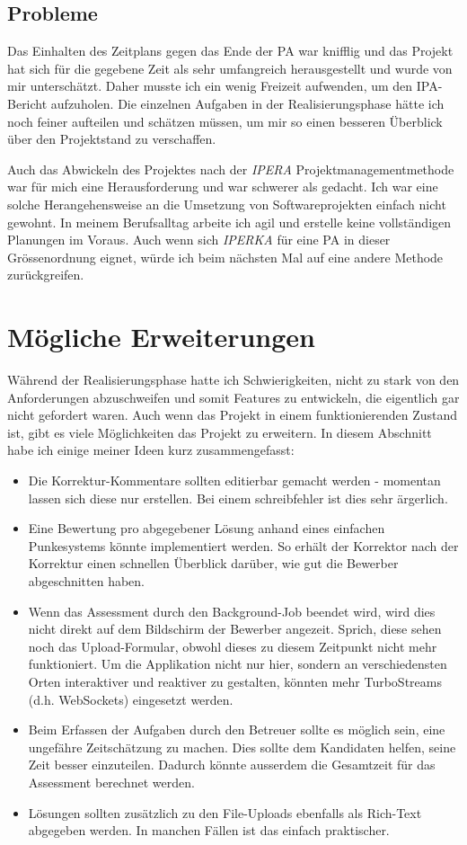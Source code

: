 \subsection{Probleme}
Das Einhalten des Zeitplans gegen das Ende der PA war knifflig und das Projekt hat sich für die gegebene
Zeit als sehr umfangreich herausgestellt und wurde von mir unterschätzt. Daher musste ich ein wenig Freizeit aufwenden,
um den IPA-Bericht aufzuholen. Die einzelnen Aufgaben in der Realisierungsphase hätte ich noch feiner aufteilen und schätzen müssen, um mir so einen
besseren Überblick über den Projektstand zu verschaffen.

Auch das Abwickeln des Projektes nach der \emph{IPERA} Projektmanagementmethode war für mich eine Herausforderung und war schwerer als gedacht. 
Ich war eine solche Herangehensweise an die Umsetzung von Softwareprojekten einfach nicht gewohnt. In meinem
Berufsalltag arbeite ich agil und erstelle keine vollständigen Planungen im Voraus. Auch wenn sich \emph{IPERKA} für eine PA in dieser Grössenordnung
eignet, würde ich beim nächsten Mal auf eine andere Methode zurückgreifen.

\section{Mögliche Erweiterungen}

Während der Realisierungsphase hatte ich Schwierigkeiten, nicht zu stark von den Anforderungen abzuschweifen und somit Features zu
entwickeln, die eigentlich gar nicht gefordert waren. Auch wenn das Projekt in einem funktionierenden Zustand ist, gibt es viele Möglichkeiten
das Projekt zu erweitern. In diesem Abschnitt habe ich einige meiner Ideen kurz zusammengefasst:

\begin{itemize}
  \item Die Korrektur-Kommentare sollten editierbar gemacht werden - momentan lassen sich diese nur erstellen. Bei einem schreibfehler ist dies sehr ärgerlich.
  \item Eine Bewertung pro abgegebener Lösung anhand eines einfachen Punkesystems könnte implementiert werden. So erhält der Korrektor nach der Korrektur einen schnellen Überblick darüber,
        wie gut die Bewerber abgeschnitten haben.
  \item Wenn das Assessment durch den Background-Job beendet wird, wird dies nicht direkt auf dem Bildschirm der Bewerber angezeit. Sprich, diese sehen
        noch das Upload-Formular, obwohl dieses zu diesem Zeitpunkt nicht mehr funktioniert.
        Um die Applikation nicht nur hier, sondern an verschiedensten Orten interaktiver und reaktiver zu gestalten, könnten mehr TurboStreams (d.h. WebSockets) eingesetzt werden.
  \item Beim Erfassen der Aufgaben durch den Betreuer sollte es möglich sein, eine ungefähre Zeitschätzung zu machen. Dies sollte dem Kandidaten helfen,
        seine Zeit besser einzuteilen. Dadurch könnte ausserdem die Gesamtzeit für das Assessment berechnet werden.
  \item Lösungen sollten zusätzlich zu den File-Uploads ebenfalls als Rich-Text abgegeben werden. In manchen Fällen ist das einfach praktischer.
\end{itemize}
